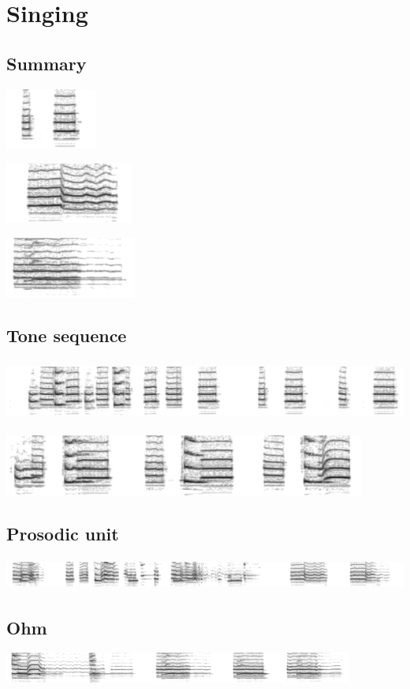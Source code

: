 
\section{Singing}

\subsection{Summary}

\includegraphics[height=2cm]{images/chico-output-separate-high-low}

\includegraphics[height=2cm]{images/chico-output-pair-high-low}

\includegraphics[height=2cm]{images/chico-output-ohm}

\subsection{Tone sequence}

\includegraphics[height=2cm]{images/chico-separate-begin}

\includegraphics[height=2cm]{images/chico-separate-together}

\subsection{Prosodic unit}

\includegraphics[height=1cm]{images/chico-pair}

\subsection{Ohm}

\includegraphics[height=1cm]{images/chico-ohm}




